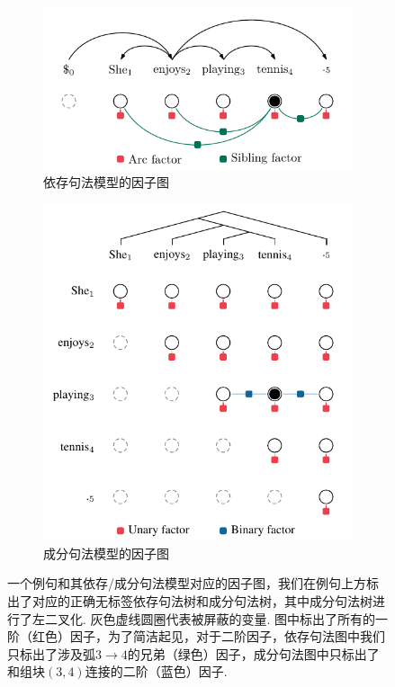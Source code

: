 \begin{figure}[tb!]
	\centering
	\begin{subfigure}[b]{0.8\textwidth}
		\centering
		\includegraphics[scale=1]{figures/dep-factors.pdf}
		\caption{依存句法模型的因子图}
		\label{fig:dep-factors}
	\end{subfigure}
	\begin{subfigure}[b]{0.8\textwidth}
		\centering
		\includegraphics[scale=1]{figures/con-factors.pdf}
		\caption{成分句法模型的因子图}
		\label{fig:con-factors}
	\end{subfigure}
	\caption{一个例句和其依存/成分句法模型对应的因子图，我们在例句上方标出了对应的正确无标签依存句法树和成分句法树，其中成分句法树进行了左二叉化.
		灰色虚线圆圈代表被屏蔽的变量.
		图中标出了所有的一阶（红色）因子，为了简洁起见，对于二阶因子，依存句法图中我们只标出了涉及弧$3\rightarrow 4$的兄弟（绿色）因子，成分句法图中只标出了和组块$(3, 4)$连接的二阶（蓝色）因子.}
	\label{fig:vi-factors}
\end{figure}

